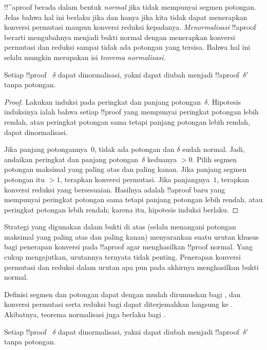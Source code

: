 \documentclass[../../../include/open-logic-section]{subfiles}
\begin{document}


!!^a{proof} berada dalam bentuk \emph{normal} jika tidak mempunyai segmen
potongan. Jelas bahwa hal ini berlaku jika dan hanya jika kita tidak dapat
menerapkan konversi permutasi maupun konversi reduksi kepadanya.
\emph{Menormalisasi} !!a{proof} berarti mengubahnya menjadi bukti normal
dengan menerapkan konversi permutasi dan reduksi sampai tidak ada potongan
yang tersisa. Bahwa hal ini selalu mungkin merupakan isi
\emph{teorema normalisasi}.

\begin{thm} Setiap !!{proof}~
$\delta$ dapat dinormalisasi, yakni dapat diubah menjadi
!!a{proof}~$\delta'$ tanpa potongan.
\end{thm}

\begin{proof}
  Lakukan induksi pada peringkat dan panjang potongan~$\delta$. Hipotesis
  induksinya ialah bahwa setiap !!{proof} yang mempunyai peringkat potongan
  lebih rendah, atau peringkat potongan sama tetapi panjang potongan lebih
  rendah, dapat dinormalisasi.

  Jika panjang potongannya~$0$, tidak ada potongan dan $\delta$ sudah
  normal. Jadi, andaikan peringkat dan panjang potongan~$\delta$ keduanya
  $>0$. Pilih segmen potongan maksimal yang paling atas dan paling kanan.
  Jika panjang segmen potongan itu $>1$, terapkan konversi permutasi. Jika
  panjangnya~$1$, terapkan konversi reduksi yang bersesuaian. Hasilnya adalah
  !!a{proof} baru yang mempunyai peringkat potongan sama tetapi panjang
  potongan lebih rendah, atau peringkat potongan lebih rendah; karena itu,
  hipotesis induksi berlaku.
\end{proof}

Strategi yang digunakan dalam bukti di atas (selalu menangani potongan
maksimal yang paling atas dan paling kanan) menyarankan suatu urutan khusus
bagi penerapan konversi pada !!a{proof} agar menghasilkan !!{proof} normal.
Yang cukup mengejutkan, urutannya ternyata tidak penting. Penerapan konversi
permutasi dan reduksi dalam urutan apa pun pada akhirnya menghasilkan bukti
normal.

Definisi segmen dan potongan dapat dengan mudah dirumuskan bagi ,
dan konversi permutasi serta reduksi bagi  dapat diterjemahkan
langsung ke . Akibatnya, teorema normalisasi juga berlaku bagi
.

\begin{thm} Setiap !!{proof}~
$\delta$ dapat dinormalisasi, yakni dapat diubah menjadi
!!a{proof}~$\delta'$ tanpa potongan.
\end{thm}
\end{document}
